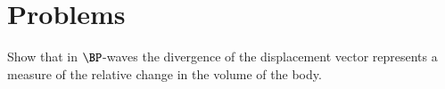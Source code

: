 % 
% 
% 
% 
% 
% 
% 
% 
% 
% 
% 
% 
\section{Problems}

\begin{Exercise}[title={$\BP$-waves, $\BS$-waves, and Love-waves}, label={problem:elastic:displacements:midtermQ1a}]

Show that in $\BP$-waves the divergence of the displacement vector represents a measure of the relative change in the volume of the body.
\end{Exercise}

